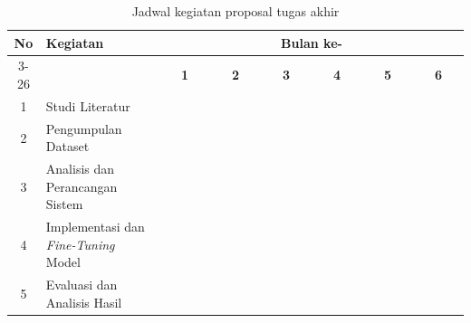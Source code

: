 \begin{table}[h!]
\centering
\caption{Jadwal kegiatan proposal tugas akhir}
\label{tab:jadwal_kegiatan}

\begin{tabular}{|c|m{3.5cm}|*{24}{c|}}
\hline

\multirow{2}{*}{\textbf{No}} &
\multirow{2}{*}{\textbf{Kegiatan}} &
\multicolumn{24}{c|}{\textbf{Bulan ke-}} \\

\cline{3-26}

& &
\multicolumn{4}{c|}{\textbf{1}} &
\multicolumn{4}{c|}{\textbf{2}} &
\multicolumn{4}{c|}{\textbf{3}} &
\multicolumn{4}{c|}{\textbf{4}} &
\multicolumn{4}{c|}{\textbf{5}} &
\multicolumn{4}{c|}{\textbf{6}} \\

\hline

1 &
Studi Literatur &
\cellcolor{blue!25} & \cellcolor{blue!25} & \cellcolor{blue!25} & \cellcolor{blue!25} &
\cellcolor{blue!25} & \cellcolor{blue!25} & \cellcolor{blue!25} & \cellcolor{blue!25} &
{} & {} & {} & {} &
{} & {} & {} & {} &
{} & {} & {} & {} &
{} & {} & {} & {} \\
\hline

2 &
Pengumpulan Dataset &
\cellcolor{blue!25} & \cellcolor{blue!25} & \cellcolor{blue!25} & \cellcolor{blue!25} &
\cellcolor{blue!25} & \cellcolor{blue!25} & \cellcolor{blue!25} & \cellcolor{blue!25} &
{} & {} & {} & {} &
{} & {} & {} & {} &
{} & {} & {} & {} &
{} & {} & {} & {} \\
\hline

3 &
Analisis dan Perancangan Sistem &
{} & {} & {} & {} &
\cellcolor{blue!25} & \cellcolor{blue!25} & \cellcolor{blue!25} & \cellcolor{blue!25} &
\cellcolor{blue!25} & \cellcolor{blue!25} & \cellcolor{blue!25} & \cellcolor{blue!25} &
{} & {} & {} & {} &
{} & {} & {} & {} &
{} & {} & {} & {} \\
\hline

4 &
Implementasi dan \textit{Fine-Tuning} Model &
{} & {} & {} & {} &
{} & {} & {} & {} &
\cellcolor{blue!25} & \cellcolor{blue!25} & \cellcolor{blue!25} & \cellcolor{blue!25} &
\cellcolor{blue!25} & \cellcolor{blue!25} & \cellcolor{blue!25} & \cellcolor{blue!25} &
{} & {} & {} & {} &
{} & {} & {} & {} \\
\hline

5 &
Evaluasi dan Analisis Hasil &
{} & {} & {} & {} &
{} & {} & {} & {} &
{} & {} & {} & {} &
\cellcolor{blue!25} & \cellcolor{blue!25} & \cellcolor{blue!25} & \cellcolor{blue!25} &
\cellcolor{blue!25} & \cellcolor{blue!25} & \cellcolor{blue!25} & \cellcolor{blue!25} &
{} & {} & {} & {} \\
\hline


\end{tabular}
\end{table}
